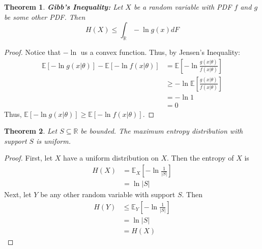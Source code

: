 \documentclass{article}
\newtheorem{theorem}{Theorem}
\theoremstyle{definition}\newtheorem{definition}{DEF}
\theoremstyle{definition}\newtheorem{example}{Ex}
\theoremstyle{lemma}\newtheorem{lemma}{Lemma}
\theoremstyle{corrolary}\newtheorem{corrolary}{Cor}
\begin{document}
\begin{theorem}
\textbf{Gibb's Inequality:}
Let $X$ be a random variable with PDF $f$ and $g$ be some other PDF.
Then
\begin{equation}
H(X) \leq \int_\mathbb{R} -\ln g(x) dF
\end{equation}
\end{theorem}
\begin{proof}
Notice that $-\ln$ us a convex function.
Thus, by Jensen's Inequality:
\begin{align*}
\mathbb{E}[-\ln g(x|\theta)] - \mathbb{E}[-\ln f(x|\theta)]
&= \mathbb{E}\left[ -\ln \frac{g(x|\theta)}{f(x|\theta)}\right] \\
&\geq -\ln \mathbb{E}\left[ \frac{g(x|\theta)}{f(x|\theta)} \right] \\
&= -\ln 1\\
&= 0
\end{align*}
Thus, $\mathbb{E}[-\ln g(x|\theta)] \geq \mathbb{E}[-\ln f(x|\theta)]$.
\end{proof}

\begin{theorem}
Let $S\subseteq \mathbb{R}$ be bounded.
The maximum entropy distribution with support $S$ is uniform.
\end{theorem}
\begin{proof}
First, let $X$ have a uniform distribution on $X$.
Then the entropy of $X$ is
\begin{align*}
H(X)
&= \mathbb{E}_X\left[ -\ln \frac{1}{|S|} \right] \\
&= \ln |S|
\end{align*}
Next, let $Y$ be any other random variable with support $S$.
Then
\begin{align*}
H(Y)
&\leq \mathbb{E}_Y \left[ -\ln \frac{1}{|S|}\right] \\
&= \ln |S| \\
&= H(X)
\end{align*}
\end{proof}
\end{document}

